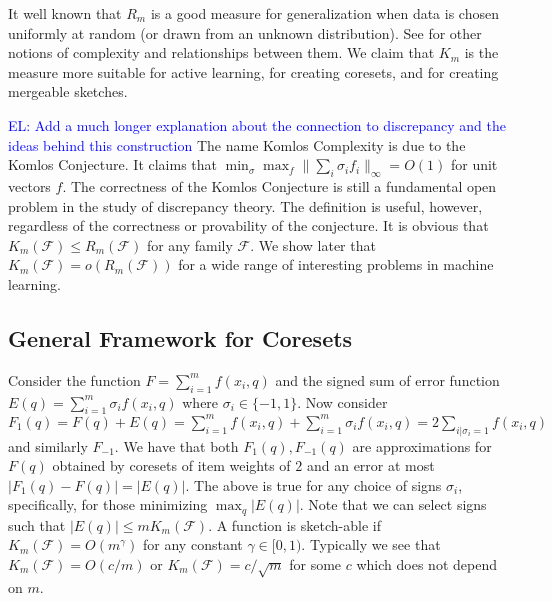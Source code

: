 \documentclass{article} %
\newtheorem{theorem}{Theorem}[section]
\newcommand{\el}[1]{\textcolor{blue}{EL: #1}}
\newcommand{\eps}{\epsilon}
\newcommand{\F}{\mathcal{F}}
\begin{document}
\noindent It well known that $R_m$ is a good measure for generalization when data is chosen uniformly at random (or drawn from an unknown distribution). See \cite{Bartlett:2003:RGC:944919.944944} for other notions of complexity and relationships between them. We claim that $K_m$ is the measure more suitable for active learning, for creating coresets, and for creating mergeable sketches.

\el{Add a much longer explanation about the connection to discrepancy and the ideas behind this construction} The name Komlos Complexity is due to the Komlos Conjecture. It claims that $\min_\sigma \max_f \|\sum_i \sigma_i f_i\|_\infty = O(1)$ for unit vectors $f$. The correctness of the Komlos Conjecture is still a fundamental open problem in the study of discrepancy theory.  The definition is useful, however, regardless of the correctness or provability of the conjecture.  
It is obvious that  $K_m(\F) \le R_m(\F)$ for any family $\F$. We show later that $K_m(\F) = o(R_m(\F))$ for a wide range of interesting problems in machine learning.


\subsection{General Framework for Coresets}
Consider the function $F = \sum_{i=1}^{m} f(x_i,q)$ and the signed sum of error function $E(q) = \sum_{i=1}^{m} \sigma_i f(x_i,q)$ where $\sigma_i \in \{-1,1\}$.
Now consider $F_1(q) = F(q) + E(q) = \sum_{i=1}^{m} f(x_i,q)  + \sum_{i=1}^{m} \sigma_i f(x_i,q)  = 2 \sum_{i | \sigma_i=1} f(x_i,q)$ and similarly $F_{-1}$. We have that both $F_1(q), F_{-1}(q)$ are approximations for $F(q)$ obtained by coresets of item weights of $2$ and an error at most $|F_1(q) - F(q)| =  |E(q)|$.
%
The above is true for any choice of signs $\sigma_i$, specifically, for those minimizing $\max_q | E(q)|$.
Note that we can select signs such that $|E(q)| \le m K_m(\F)$.
A function is sketch-able if $K_m(\F) = O(m^\gamma)$ for any constant $\gamma \in [0,1)$.
Typically we see that $K_m(\F) = O(c/m)$ or $K_m(\F)= c/\sqrt{m}$ for some $c$ which does not depend on $m$.
\end{document}
